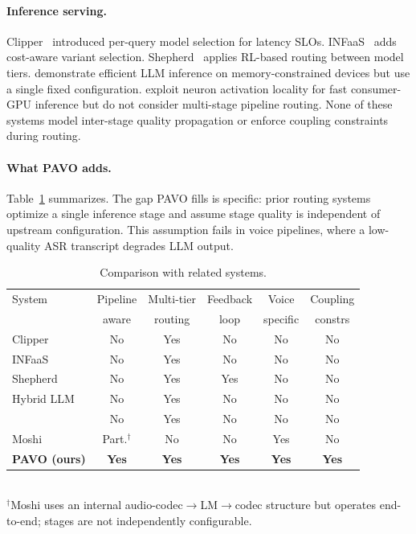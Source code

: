\documentclass{article}
\begin{document}
\paragraph{Inference serving.} Clipper~\citep{clipper2017} introduced per-query model selection for latency SLOs. INFaaS~\citep{romero2021infaas} adds cost-aware variant selection. Shepherd~\citep{gujarati2023shepherd} applies RL-based routing between model tiers. \citet{alizadeh2024llmflash} demonstrate efficient LLM inference on memory-constrained devices but use a single fixed configuration. \citet{song2023powerinfer} exploit neuron activation locality for fast consumer-GPU inference but do not consider multi-stage pipeline routing. None of these systems model inter-stage quality propagation or enforce coupling constraints during routing.

\paragraph{What PAVO adds.} Table~\ref{tab:comparison} summarizes. The gap PAVO fills is specific: prior routing systems optimize a single inference stage and assume stage quality is independent of upstream configuration. This assumption fails in voice pipelines, where a low-quality ASR transcript degrades LLM output.

\begin{table}[t]
\centering
\caption{Comparison with related systems.}
\label{tab:comparison}
\small
\begin{tabular}{lccccc}
\toprule
System & Pipeline & Multi-tier & Feedback & Voice & Coupling \\
 & aware & routing & loop & specific & constrs \\
\midrule
Clipper~\citep{clipper2017}          & No   & Yes & No  & No   & No  \\
INFaaS~\citep{romero2021infaas}      & No   & Yes & No  & No   & No  \\
Shepherd~\citep{gujarati2023shepherd}& No   & Yes & Yes & No   & No  \\
Hybrid LLM~\citep{snell2024scaling}  & No   & Yes & No  & No   & No  \\
\citet{alizadeh2024llmflash}         & No   & Yes & No  & No   & No  \\
Moshi~\citep{defossez2024moshi}      & Part.$^\dagger$& No  & No  & Yes  & No  \\
\textbf{PAVO (ours)}               & \textbf{Yes} & \textbf{Yes} & \textbf{Yes} & \textbf{Yes} & \textbf{Yes} \\
\bottomrule
\end{tabular}
\vspace{2pt}\\
{\scriptsize $^\dagger$Moshi uses an internal audio-codec$\to$LM$\to$codec structure but operates end-to-end; stages are not independently configurable.}
\end{table}
\end{document}

